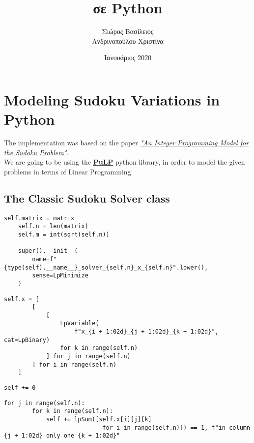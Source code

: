 \documentclass[12pt]{article}
\title{\hugeΥλοποίηση σε Python}
\author{Σιώρος Βασίλειος\\Ανδρινοπούλου Χριστίνα}
\date{Ιανουάριος 2020}
\begin{document}
\maketitle


\pagebreak

\section{Modeling Sudoku Variations in Python}

The implementation was based on the paper \href{https://www.researchgate.net/publication/228615106_An_integer_programming_model_for_the_sudoku_problem}{\textit{"An Integer Programming Model
for the Sudoku Problem"}}. \\

We are going to be using the \href{https://pythonhosted.org/PuLP/}{\textbf{PuLP}} python library,
in order to model the given problems in terms of Linear Programming. \\

\subsection{The Classic Sudoku Solver class}

\begin{lstlisting}[caption={Initializing the \textbf{LpProblem} super class as a minimization problem}]
    self.matrix = matrix
    self.n = len(matrix)
    self.m = int(sqrt(self.n))

    super().__init__(
        name=f"{type(self).__name__}_solver_{self.n}_x_{self.n}".lower(),
        sense=LpMinimize
    )
\end{lstlisting}

\begin{lstlisting}[caption={Declaring our variables}]
    self.x = [
        [
            [
                LpVariable(
                    f"x_{i + 1:02d}_{j + 1:02d}_{k + 1:02d}", cat=LpBinary)
                for k in range(self.n)
            ] for j in range(self.n)
        ] for i in range(self.n)
    ]
\end{lstlisting}

\begin{lstlisting}[caption={Declaring the objective function}]
    self += 0
\end{lstlisting}

\pagebreak

\begin{lstlisting}[caption={Declaring that there should only be one \textit{k} in each column}]
    for j in range(self.n):
        for k in range(self.n):
            self += lpSum([self.x[i][j][k]
                            for i in range(self.n)]) == 1, f"in column {j + 1:02d} only one {k + 1:02d}"
\end{lstlisting}
\end{document}
